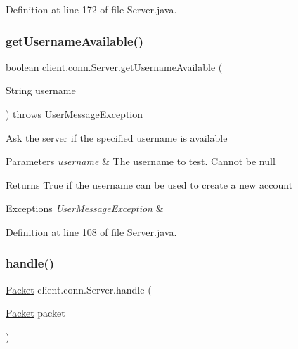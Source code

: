 Definition at line 172 of file Server.\+java.

\hypertarget{classclient_1_1conn_1_1_server_ab25d4a9f33372c404d2464d1b608dd77}{}\label{classclient_1_1conn_1_1_server_ab25d4a9f33372c404d2464d1b608dd77} 
\subsubsection{\texorpdfstring{get\+Username\+Available()}{getUsernameAvailable()}}
{\footnotesize\ttfamily boolean client.\+conn.\+Server.\+get\+Username\+Available (\begin{DoxyParamCaption}\item[{String}]{username }\end{DoxyParamCaption}) throws \hyperlink{classpt_1_1up_1_1fe_1_1lpro1613_1_1sharedlib_1_1exceptions_1_1_user_message_exception}{User\+Message\+Exception}}

Ask the server if the specified username is available 
\begin{DoxyParams}{Parameters}
{\em username} & The username to test. Cannot be null \\
\hline
\end{DoxyParams}
\begin{DoxyReturn}{Returns}
True if the username can be used to create a new account 
\end{DoxyReturn}

\begin{DoxyExceptions}{Exceptions}
{\em User\+Message\+Exception} & \\
\hline
\end{DoxyExceptions}


Definition at line 108 of file Server.\+java.

\hypertarget{classclient_1_1conn_1_1_server_a620def50e5115d3798407dfff5433ead}{}\label{classclient_1_1conn_1_1_server_a620def50e5115d3798407dfff5433ead} 
\subsubsection{\texorpdfstring{handle()}{handle()}}
{\footnotesize\ttfamily \hyperlink{classpt_1_1up_1_1fe_1_1lpro1613_1_1sharedlib_1_1conn_1_1_packet}{Packet} client.\+conn.\+Server.\+handle (\begin{DoxyParamCaption}\item[{\hyperlink{classpt_1_1up_1_1fe_1_1lpro1613_1_1sharedlib_1_1conn_1_1_packet}{Packet}}]{packet }\end{DoxyParamCaption})}

